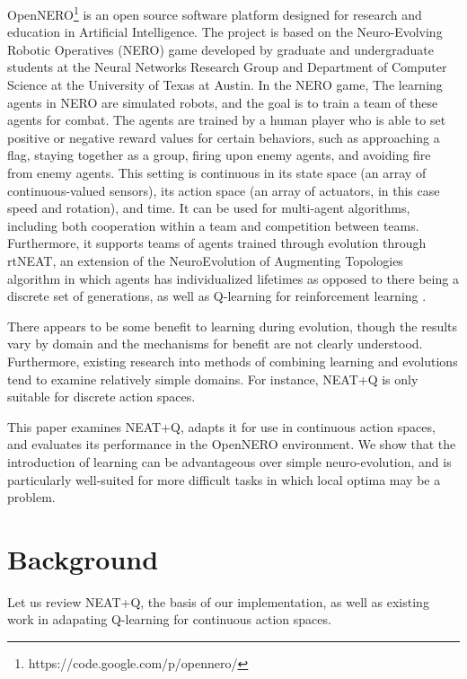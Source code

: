 \documentclass[letterpaper]{article}
\begin{document}
OpenNERO\footnote{https://code.google.com/p/opennero/} is an open source software platform designed for research and education in Artificial Intelligence. The project is based on the Neuro-Evolving Robotic Operatives (NERO) game developed by graduate and undergraduate students at the Neural Networks Research Group and Department of Computer Science at the University of Texas at Austin. In the NERO game, The learning agents in NERO are simulated robots, and the goal is to train a team of these agents for combat. The agents are trained by a human player who is able to set positive or negative reward values for certain behaviors, such as approaching a flag, staying together as a group, firing upon enemy agents, and avoiding fire from enemy agents. This setting is continuous in its state space (an array of continuous-valued sensors), its action space (an array of actuators, in this case speed and rotation), and time. It can be used for multi-agent algorithms, including both cooperation within a team and competition between teams. Furthermore, it supports teams of agents trained through evolution through rtNEAT, an extension of the NeuroEvolution of Augmenting Topologies algorithm in which agents has individualized lifetimes as opposed to there being a discrete set of generations, as well as Q-learning for reinforcement learning \cite{stanley2006real}.

There appears to be some benefit to learning during evolution, though the results vary by domain and the mechanisms for benefit are not clearly understood. Furthermore, existing research into methods of combining learning and evolutions tend to examine relatively simple domains. For instance, NEAT+Q \cite{whiteson2006evolutionary} is only suitable for discrete action spaces.

This paper examines NEAT+Q, adapts it for use in continuous action spaces, and evaluates its performance in the OpenNERO environment. We show that the introduction of learning can be advantageous over simple neuro-evolution, and is particularly well-suited for more difficult tasks in which local optima may be a problem. 

\section{Background}
Let us review NEAT+Q, the basis of our implementation, as well as existing work in adapating Q-learning for continuous action spaces.
\end{document}
